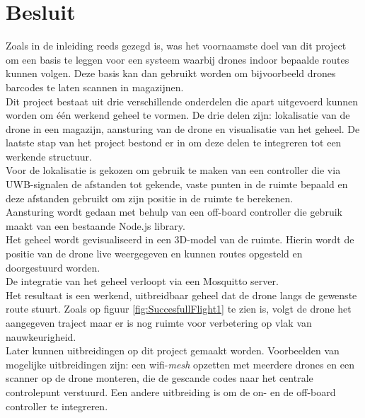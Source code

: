 \chapter*{Besluit}
Zoals in de inleiding reeds gezegd is, was het voornaamste doel van dit project om een basis te leggen voor een systeem waarbij drones indoor bepaalde routes kunnen volgen.
Deze basis kan dan gebruikt worden om bijvoorbeeld drones barcodes te laten scannen in magazijnen.\\

Dit project bestaat uit drie verschillende onderdelen die apart uitgevoerd kunnen worden om één werkend geheel te vormen.
De drie delen zijn: lokalisatie van de drone in een magazijn, aansturing van de drone en visualisatie van het geheel.
De laatste stap van het project bestond er in om deze delen te integreren tot een werkende structuur.\\

Voor de lokalisatie is gekozen om gebruik te maken van een controller die via UWB-signalen de afstanden tot gekende, vaste punten in de ruimte bepaald en deze afstanden gebruikt om zijn positie in de ruimte te berekenen.\\
Aansturing wordt gedaan met behulp van een off-board controller die gebruik maakt van een bestaande Node.js library.\\
Het geheel wordt gevisualiseerd in een 3D-model van de ruimte. Hierin wordt de positie van de drone live weergegeven en kunnen routes opgesteld en doorgestuurd worden.\\
De integratie van het geheel verloopt via een Mosquitto server.\\

Het resultaat is een werkend, uitbreidbaar geheel dat de drone langs de gewenste route stuurt. Zoals op figuur \ref{fig:SuccesfullFlight1} te zien is, volgt de drone het aangegeven traject maar er is nog ruimte voor verbetering op vlak van nauwkeurigheid.\\

Later kunnen uitbreidingen op dit project gemaakt worden. Voorbeelden van mogelijke uitbreidingen zijn: een wifi-\textit{mesh} opzetten met meerdere drones en een scanner op de drone monteren, die de gescande codes naar het centrale controlepunt verstuurd.
Een andere uitbreiding is om de on- en de off-board controller te integreren.\\